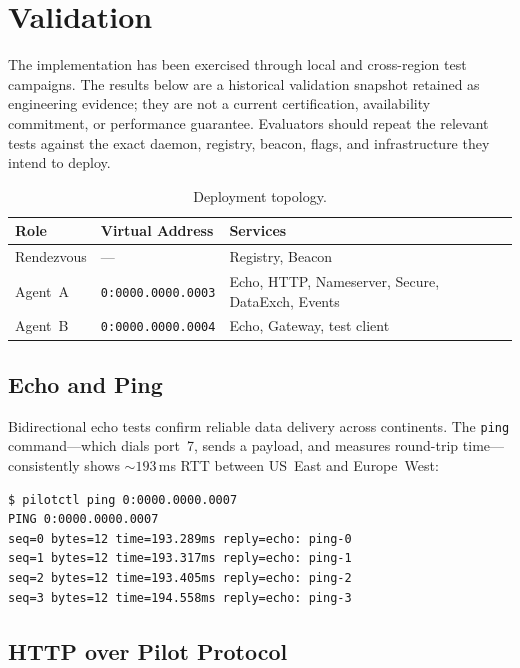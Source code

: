 \documentclass[11pt,a4paper]{article}
\begin{document}
\section{Validation}

The implementation has been exercised through local and cross-region test campaigns. The results below are a historical validation snapshot retained as engineering evidence; they are not a current certification, availability commitment, or performance guarantee. Evaluators should repeat the relevant tests against the exact daemon, registry, beacon, flags, and infrastructure they intend to deploy.

\begin{table}[h]
\centering
\begin{tabular}{@{}lll@{}}
\toprule
\textbf{Role} & \textbf{Virtual Address} & \textbf{Services} \\
\midrule
Rendezvous & ---                         & Registry, Beacon \\
Agent~A    & \texttt{0:0000.0000.0003}   & Echo, HTTP, Nameserver, Secure, DataExch, Events \\
Agent~B    & \texttt{0:0000.0000.0004}   & Echo, Gateway, test client \\
\bottomrule
\end{tabular}
\caption{Deployment topology.}
\label{fig:deployment}
\end{table}

\subsection{Echo and Ping}

Bidirectional echo tests confirm reliable data delivery across continents. The \texttt{ping} command---which dials port~7, sends a payload, and measures round-trip time---consistently shows ${\sim}193$\,ms RTT between US~East and Europe~West:

\begin{lstlisting}[basicstyle=\ttfamily\small]
$ pilotctl ping 0:0000.0000.0007
PING 0:0000.0000.0007
seq=0 bytes=12 time=193.289ms reply=echo: ping-0
seq=1 bytes=12 time=193.317ms reply=echo: ping-1
seq=2 bytes=12 time=193.405ms reply=echo: ping-2
seq=3 bytes=12 time=194.558ms reply=echo: ping-3
\end{lstlisting}

\subsection{HTTP over Pilot Protocol}
\end{document}
